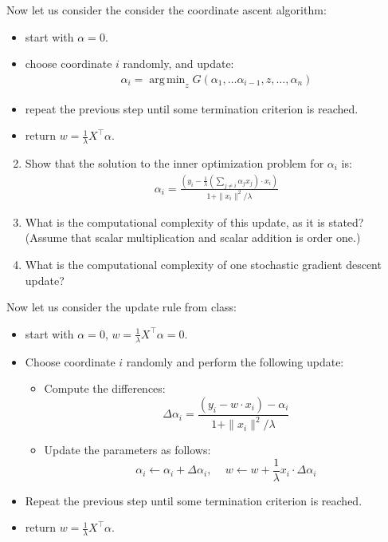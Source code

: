 \documentclass{article}
\DeclareMathOperator*{\argmin}{arg\,min}
\begin{document}
Now let us consider the consider the coordinate ascent algorithm:
\begin{itemize}
	\item start with $\alpha=0$.
	\item choose coordinate $i$ randomly, and update:
	\begin{align}
	\alpha_i = \argmin_z G(\alpha_1, \ldots \alpha_{i-1}, z, \ldots, \alpha_n)
	\end{align}
	\item repeat the previous step until some termination criterion is reached.
	\item return $w =\frac{1}{\lambda} X^\top \alpha$.
\end{itemize}

\begin{enumerate}
\setcounter{enumi}{1} 
	\item Show that the solution to the inner optimization problem for $\alpha_i$ is:
	\begin{align}
	\alpha_i = \frac{ (y_i - \frac{1}{\lambda}(\sum_{j\neq i} \alpha_j x_j)\cdot x_i )}{1+\|x_i\|^2/\lambda} 
	\end{align}
	\item What is the computational complexity of this update, as it is stated? (Assume that scalar multiplication and scalar addition is order one.)
	\item What is the computational complexity of one stochastic gradient descent update?
\end{enumerate}

Now let us consider the update rule from class:

\begin{itemize}
	\item start with $\alpha=0$, $w=\frac{1}{\lambda} X^\top \alpha=0$.
	\item Choose coordinate $i$ randomly and perform the following update:
	\begin{itemize}
		\item Compute the differences:
		\begin{equation}\label{eq:delta}
			\Delta \alpha_i =\frac{ (y_i -w\cdot x_i )-\alpha_i}{1+\|x_i\|^2/\lambda} 
		\end{equation}
		\item Update the parameters as follows:
		\begin{equation}\label{eq:update}
			\alpha_i \leftarrow \alpha_i+\Delta\alpha_i, \, \quad w \leftarrow w+\frac{1}{\lambda}x_i \cdot \Delta\alpha_i
		\end{equation}
	\end{itemize}
	\item Repeat the previous step until some termination criterion is reached.
	\item return $w =\frac{1}{\lambda} X^\top \alpha$.
\end{itemize}
\end{document}
